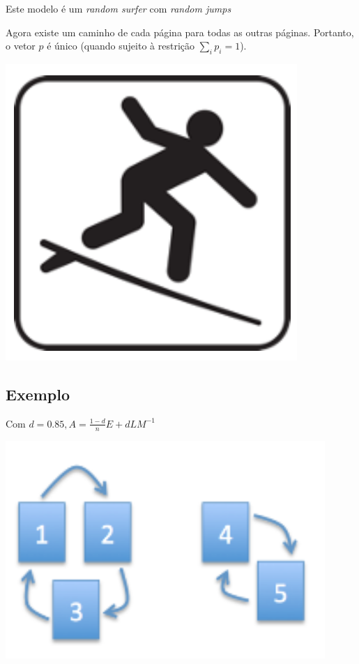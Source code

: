 \documentclass[
  letterpaper,
  DIV=11,
  numbers=noendperiod]{scrartcl}
\begin{document}
Este modelo é um \emph{random surfer} com \emph{random jumps}

Agora existe um caminho de cada página para todas as outras páginas.
Portanto, o vetor \(p\) é único (quando sujeito à restrição
\(\sum_{i} p_i = 1\)).

\includegraphics{figs/Aula09/randomSurfer.png}

\hypertarget{exemplo}{%
\subsection{Exemplo}\label{exemplo}}

Com \(d = 0.85, A= \frac{1-d}{n}E + d LM^{-1}\)

\includegraphics{figs/Aula09/exemplo_BR.png}
\end{document}

